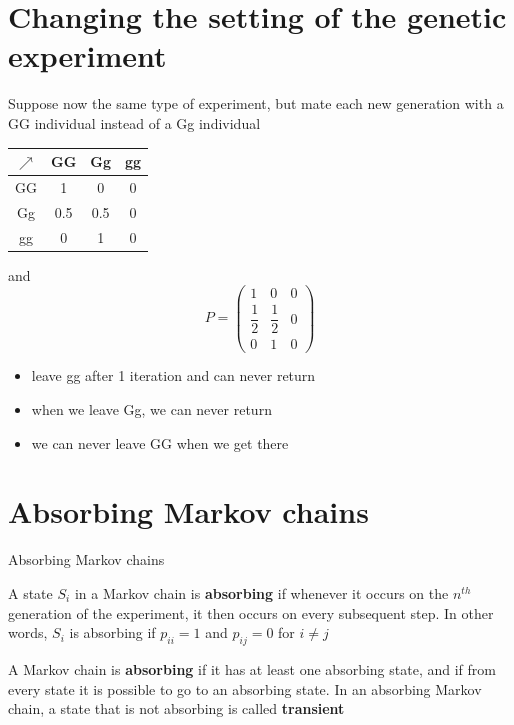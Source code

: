 \documentclass[aspectratio=43]{beamer}
\begin{document}
\section{Changing the setting of the genetic experiment}
\begin{frame}
Suppose now the same type of experiment, but mate each new generation with a GG individual instead of a Gg individual
\vfill
\begin{center}
\end{center}
\vfill
\begin{center}
\begin{tabular}{c|ccc}
$\nearrow$ & GG & Gg & gg \\
\hline
GG & 1 & 0 & 0 \\
Gg & 0.5 & 0.5 & 0 \\
gg & 0 & 1 & 0
\end{tabular}
\end{center}
and 
\[
P=\begin{pmatrix}
1 & 0 & 0 \\[2pt]
\dfrac 12 & \dfrac 12 & 0 \\[7pt]
0 & 1 & 0
\end{pmatrix}
\]
\begin{itemize}
\item leave gg after 1 iteration and can never return
\item when we leave Gg, we can never return
\item we can never leave GG when we get there
\end{itemize}
\end{frame}


\section{Absorbing Markov chains}
\begin{frame}{Absorbing Markov chains}
\begin{definition}
A state $S_i$ in a Markov chain is \textbf{absorbing} if whenever it occurs on the $n^{th}$ generation of the experiment, it then occurs on every subsequent step. In other words, $S_i$ is absorbing if $p_{ii}=1$ and $p_{ij}=0$ for $i\neq j$
\end{definition}
\vfill
\begin{definition}
A Markov chain is \textbf{absorbing} if it has at least one absorbing state, and if from every state it is possible to go to an absorbing state.
In an absorbing Markov chain, a state that is not absorbing is called \textbf{transient}
\end{definition}
\end{frame}
\end{document}
